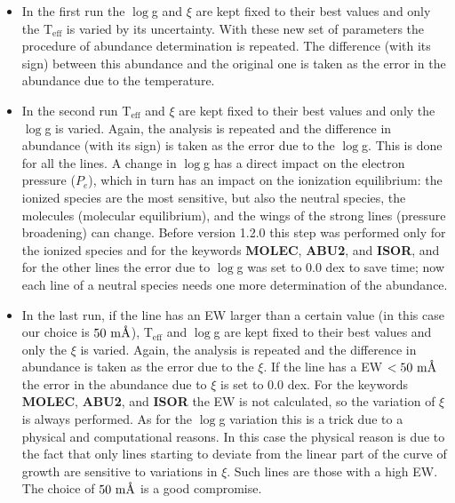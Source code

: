 \documentclass[modern]{aastex701}
\newcommand{\angstrom}{\mbox{\normalfont\AA}}
\begin{document}
\begin{itemize}
    \item In the first run the $\log$g and $\xi$ are kept fixed to their best values and only the T$_{\mathrm{eff}}$ is varied by its uncertainty. With these new set of parameters the procedure of abundance determination is repeated. The difference (with its sign) between this abundance and the original one is taken as the error in the abundance due to the temperature.  
    \item In the second run T$_{\mathrm{eff}}$ and $\xi$ are kept fixed to their best values and only the $\log$g is varied. Again, the analysis is repeated and the difference in abundance (with its sign) is taken as the error due to the $\log$g. This is done for all the lines. A change in $\log$g has a direct impact on the electron pressure ($P_e$), which in turn has an impact on the ionization equilibrium: the ionized species are the most sensitive, but also the neutral species, the molecules (molecular equilibrium), and the wings of the strong lines (pressure broadening) can change. Before version 1.2.0 this step was performed only for the ionized species and for the keywords {\bf MOLEC}, {\bf ABU2}, and {\bf ISOR}, and for the other lines the error due to $\log$g was set to 0.0 dex to save time; now each line of a neutral species needs one more determination of the abundance.
    \item In the last run, if the line has an EW larger than a certain value (in this case our choice is $50 ~\mathrm{m}\angstrom$),  T$_{\mathrm{eff}}$ and $\log$g are kept fixed to their best values and only the $\xi$ is varied. Again, the analysis is repeated and the difference in abundance is taken as the error due to the $\xi$. If the line has a EW $< 50 ~\mathrm{m}\angstrom$ the error in the abundance due to $\xi$  is set to 0.0 dex. For the keywords {\bf MOLEC}, {\bf ABU2}, and {\bf ISOR} the EW is not calculated, so the variation of $\xi$ is always performed. As for the $\log$g variation this is a trick due to a physical and computational reasons. In this case the physical reason is due to the fact that only lines starting to deviate from the linear part of the curve of growth are sensitive to variations in $\xi$. Such lines are those with a high EW. The choice of $50 ~\mathrm{m}\angstrom$ is a good compromise.  
\end{itemize}
\end{document}
